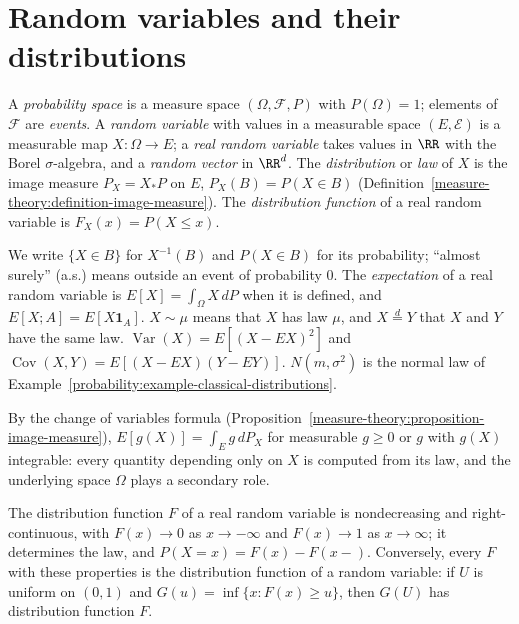 \section{Random variables and their distributions}\label{probability:section-random-variables}

\begin{definition}\label{probability:definition-probability-space}
A \emph{probability space} is a measure space $(\Omega, \mathcal{F}, P)$ with $P(\Omega) = 1$; elements of $\mathcal{F}$ are \emph{events}. A \emph{random variable} with values in a measurable space $(E, \mathcal{E})$ is a measurable
map $X \colon \Omega \to E$; a \emph{real random variable} takes values in $\RR$ with the Borel $\sigma$-algebra, and a \emph{random vector} in $\RR^d$. The \emph{distribution} or \emph{law} of $X$ is the image measure
$P_X = X_*P$ on $E$, $P_X(B) = P(X \in B)$ (Definition~\ref{measure-theory:definition-image-measure}). The \emph{distribution function} of a real random variable is $F_X(x) = P(X \leq x)$.
\end{definition}

\begin{notation}\label{probability:notation-probability}
We write $\{X \in B\}$ for $X^{-1}(B)$ and $P(X \in B)$ for its probability; ``almost surely'' (a.s.) means outside an event of probability $0$. The \emph{expectation} of a real random variable is
$E[X] = \int_\Omega X\,dP$ when it is defined, and $E[X; A] = E[X\mathbf{1}_A]$. $X \sim \mu$ means that $X$ has law $\mu$, and $X \overset{d}{=} Y$ that $X$ and $Y$ have the same law. $\operatorname{Var}(X) = E[(X - E X)^2]$ and
$\operatorname{Cov}(X, Y) = E[(X - EX)(Y - EY)]$. $N(m, \sigma^2)$ is the normal law of Example~\ref{probability:example-classical-distributions}.
\end{notation}

By the change of variables formula (Proposition~\ref{measure-theory:proposition-image-measure}), $E[g(X)] = \int_Eg\,dP_X$ for measurable $g \geq 0$ or $g$ with $g(X)$ integrable: every quantity depending only on $X$ is
computed from its law, and the underlying space $\Omega$ plays a secondary role.

\begin{proposition}\label{probability:proposition-distribution-function}
The distribution function $F$ of a real random variable is nondecreasing and right-continuous, with $F(x) \to 0$ as $x \to -\infty$ and $F(x) \to 1$ as $x \to \infty$; it determines the law, and $P(X = x) = F(x) - F(x-)$.
Conversely, every $F$ with these properties is the distribution function of a random variable: if $U$ is uniform on $(0, 1)$ and $G(u) = \inf\{x : F(x) \geq u\}$, then $G(U)$ has distribution function $F$.
\end{proposition}

